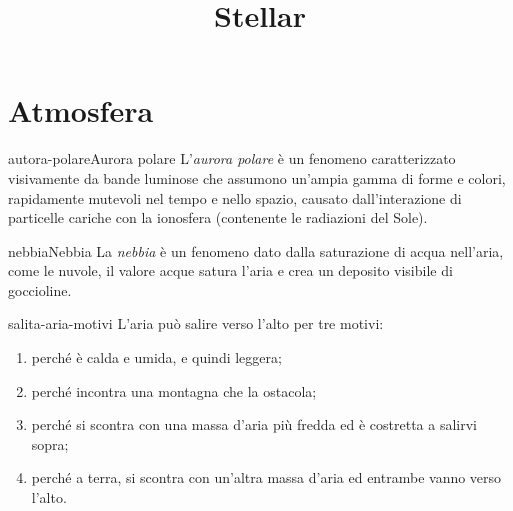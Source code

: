 \documentclass[preview]{standalone}
\begin{document}
\title{Stellar}
\genpage

\section{Atmosfera}

\begin{snippetdefinition}{autora-polare}{Aurora polare}
    L'\textit{aurora polare} è un fenomeno
    caratterizzato visivamente da bande luminose che assumono un'ampia gamma di forme e colori, rapidamente mutevoli nel tempo e nello spazio,
    causato dall'interazione di particelle cariche con la ionosfera (contenente le radiazioni del Sole).
\end{snippetdefinition}



\begin{snippetdefinition}{nebbia}{Nebbia}
    La \textit{nebbia} è un fenomeno dato dalla saturazione di acqua nell'aria,
    come le nuvole, il valore acque satura l'aria e crea un deposito visibile di goccioline.
\end{snippetdefinition}




\begin{snippet}{salita-aria-motivi}
    L'aria può salire verso l'alto per tre motivi:
    \begin{enumerate}
        \item perché è calda e umida, e quindi leggera;
        \item perché incontra una montagna che la ostacola;
        \item perché si scontra con una massa d'aria più fredda ed è costretta a salirvi sopra;
        \item perché a terra, si scontra con un'altra massa d'aria ed entrambe vanno verso l'alto.
    \end{enumerate}
\end{snippet}
\end{document}
